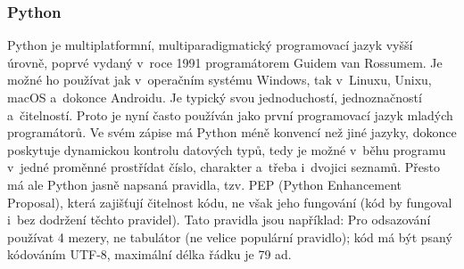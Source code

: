 \documentclass[a4paper]{extarticle}
\begin{document}
\subsubsection{Python}
Python je multiplatformní, multiparadigmatický programovací jazyk vyšší úrovně, poprvé vydaný v~roce 1991 programátorem Guidem van Rossumem. Je možné ho používat jak v~operačním systému Windows, tak v~Linuxu, Unixu, macOS a~dokonce Androidu. Je typický svou jednoduchostí, jednoznačností a~čitelností. Proto je nyní často používán jako první programovací jazyk mladých programátorů.
Ve svém zápise má Python méně konvencí než jiné jazyky, dokonce poskytuje dynamickou kontrolu datových typů, tedy je možné v~běhu programu v~jedné proměnné prostřídat číslo, charakter a~třeba i~dvojici seznamů. Přesto má ale Python jasně napsaná pravidla, tzv. PEP (Python Enhancement Proposal), která zajišťují čitelnost kódu, ne však jeho fungování (kód by fungoval i~bez dodržení těchto pravidel). Tato pravidla jsou například: Pro odsazování používat 4 mezery, ne tabulátor (ne velice populární pravidlo); kód má být psaný kódováním UTF-8, maximální délka řádku je 79 ad. \cite{python}

\printbibliography[heading=bibintoc]
\end{document}
